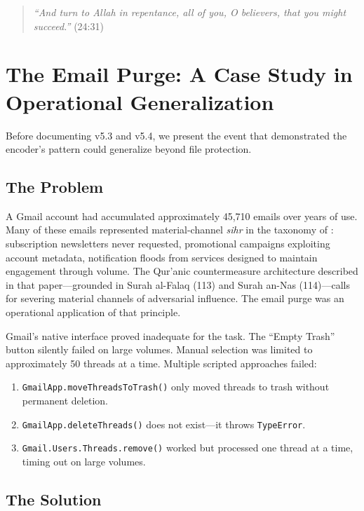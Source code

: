 \documentclass[11pt,a4paper]{article}
\begin{document}
\begin{quote}
\textit{``And turn to Allah in repentance, all of you, O believers, that you might succeed.''} (24:31)
\end{quote}


\section{The Email Purge: A Case Study in Operational Generalization}

Before documenting v5.3 and v5.4, we present the event that demonstrated the encoder's pattern could generalize beyond file protection.

\subsection{The Problem}

A Gmail account had accumulated approximately 45,710 emails over years of use. Many of these emails represented material-channel \textit{sihr} in the taxonomy of \cite{arfeen2026sihr}: subscription newsletters never requested, promotional campaigns exploiting account metadata, notification floods from services designed to maintain engagement through volume. The Qur'anic countermeasure architecture described in that paper---grounded in Surah al-Falaq (113) and Surah an-Nas (114)---calls for severing material channels of adversarial influence. The email purge was an operational application of that principle.

Gmail's native interface proved inadequate for the task. The ``Empty Trash'' button silently failed on large volumes. Manual selection was limited to approximately 50 threads at a time. Multiple scripted approaches failed:

\begin{enumerate}[nosep]
    \item \texttt{GmailApp.moveThreadsToTrash()} only moved threads to trash without permanent deletion.
    \item \texttt{GmailApp.deleteThreads()} does not exist---it throws \texttt{TypeError}.
    \item \texttt{Gmail.Users.Threads.remove()} worked but processed one thread at a time, timing out on large volumes.
\end{enumerate}

\subsection{The Solution}
\end{document}
